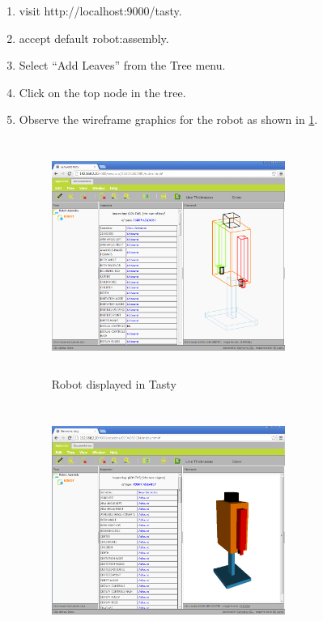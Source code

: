 \documentclass [11pt]{book}
\begin{document}
\begin{enumerate}

\item visit http://localhost:9000/tasty.

\item accept default robot:assembly.

\item Select ``Add Leaves'' from the Tree menu.

\item Click on the top node in the tree.

\item Observe the wireframe graphics for the robot as shown in 
\ref{fig:tasty-robot}.

\begin{figure}
\begin{center}
\includegraphics[width=3in,height=3in]{../images/tasty-robot.png}
\end{center}

\caption{Robot displayed in Tasty}

\label{fig:tasty-robot}

\end{figure}

\begin{figure}
\begin{center}
\includegraphics[width=3in,height=3in]{../images/tasty-robot-x3dom.png}
\end{center}


\end{figure}
\end{enumerate}
\end{document}
